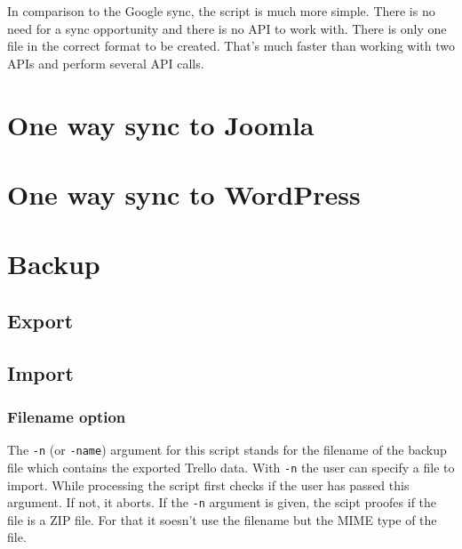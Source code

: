 

In comparison to the Google sync, the script is much more simple. There is no need for a sync opportunity and there is no API to work with. There is only one file in the correct format to be created. That's much faster than working with two APIs and perform several API calls. 

\section{One way sync to Joomla}







\section{One way sync to WordPress}



\section{Backup}







\subsection{Export}

\subsection{Import}

\subsubsection{Filename option}
The \texttt{-n} (or \texttt{-name}) argument for this script stands for the filename of the backup file which contains the  exported Trello data. With \texttt{-n} the user can specify a file to import. While processing the script first checks if the user has passed this argument. If not, it aborts. If the \texttt{-n} argument is given, the scipt proofes if the file is a ZIP file. For that it soesn't use the filename but the MIME type of the file.


